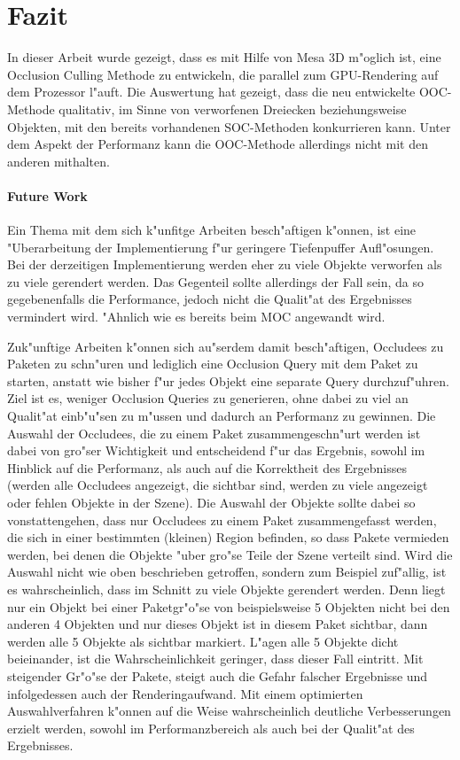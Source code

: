 \documentclass[journal]{vgtc}
\begin{document}
\section{Fazit}
In dieser Arbeit wurde gezeigt, dass es mit Hilfe von Mesa 3D m"oglich ist, eine Occlusion Culling Methode zu entwickeln, die parallel zum GPU-Rendering auf dem Prozessor l"auft.
Die Auswertung hat gezeigt, dass die neu entwickelte OOC-Methode qualitativ, im Sinne von verworfenen Dreiecken beziehungsweise Objekten, mit den bereits vorhandenen SOC-Methoden konkurrieren kann.
Unter dem Aspekt der Performanz kann die OOC-Methode allerdings nicht mit den anderen mithalten.  \\

\paragraph{Future Work} 
Ein Thema mit dem sich k"unfitge Arbeiten besch"aftigen k"onnen, ist eine "Uberarbeitung der Implementierung f"ur geringere Tiefenpuffer Aufl"osungen.
Bei der derzeitigen Implementierung werden eher zu viele Objekte verworfen als zu viele gerendert werden.
Das Gegenteil sollte allerdings der Fall sein, da so gegebenenfalls die Performance, jedoch nicht die Qualit"at des Ergebnisses vermindert wird.
"Ahnlich wie es bereits beim MOC angewandt wird.

Zuk"unftige Arbeiten k"onnen sich au"serdem damit besch"aftigen, Occludees zu Paketen zu schn"uren und lediglich eine Occlusion Query mit dem Paket zu starten, anstatt wie bisher f"ur jedes Objekt eine separate Query durchzuf"uhren.
Ziel ist es, weniger Occlusion Queries zu generieren, ohne dabei zu viel an Qualit"at einb"u"sen zu m"ussen und dadurch an Performanz zu gewinnen.
Die Auswahl der Occludees, die zu einem Paket zusammengeschn"urt werden ist dabei von gro"ser Wichtigkeit und entscheidend f"ur das Ergebnis, sowohl im Hinblick auf die Performanz, als auch auf die Korrektheit des Ergebnisses (werden alle Occludees angezeigt, die sichtbar sind, werden zu viele angezeigt oder fehlen Objekte in der Szene).
Die Auswahl der Objekte sollte dabei so vonstattengehen, dass nur Occludees zu einem Paket zusammengefasst werden, die sich in einer bestimmten (kleinen) Region befinden, so dass Pakete vermieden werden, bei denen die Objekte "uber gro"se Teile der Szene verteilt sind.
Wird die Auswahl nicht wie oben beschrieben getroffen, sondern zum Beispiel zuf"allig, ist es wahrscheinlich, dass im Schnitt zu viele Objekte gerendert werden. Denn liegt nur ein Objekt bei einer Paketgr"o"se von beispielsweise 5 Objekten nicht bei den anderen 4 Objekten und nur dieses Objekt ist in diesem Paket sichtbar, dann werden alle 5 Objekte als sichtbar markiert. L"agen alle 5 Objekte dicht beieinander, ist die Wahrscheinlichkeit geringer, dass dieser Fall eintritt.
Mit steigender Gr"o"se der Pakete, steigt auch die Gefahr falscher Ergebnisse und infolgedessen auch der Renderingaufwand.
Mit einem optimierten Auswahlverfahren k"onnen auf die Weise wahrscheinlich deutliche Verbesserungen erzielt werden, sowohl im Performanzbereich als auch bei der Qualit"at des Ergebnisses. 



 

\end{document}
